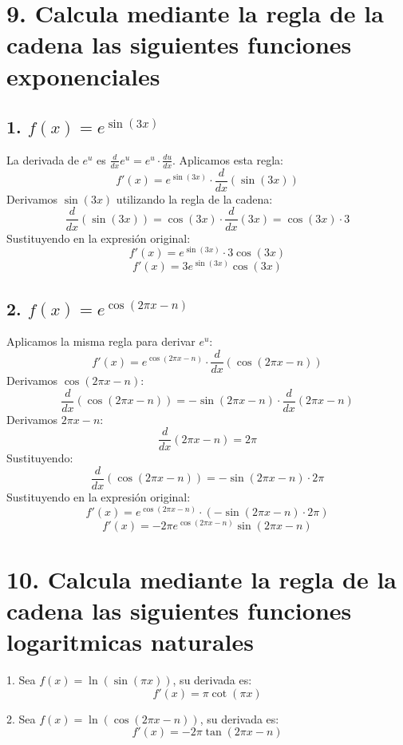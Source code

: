 \documentclass{article}
\begin{document}
\section*{9. Calcula mediante la regla de la cadena las siguientes funciones exponenciales}

\subsection*{1. $f(x) = e^{\sin(3x)}$}
La derivada de $e^u$ es $\frac{d}{dx} e^u = e^u \cdot \frac{du}{dx}$. Aplicamos esta regla:
\[
f'(x) = e^{\sin(3x)} \cdot \frac{d}{dx}(\sin(3x))
\]
Derivamos $\sin(3x)$ utilizando la regla de la cadena:
\[
\frac{d}{dx}(\sin(3x)) = \cos(3x) \cdot \frac{d}{dx}(3x) = \cos(3x) \cdot 3
\]
Sustituyendo en la expresión original:
\[
f'(x) = e^{\sin(3x)} \cdot 3\cos(3x)
\]
\[
f'(x) = 3e^{\sin(3x)}\cos(3x)
\]

\subsection*{2. $f(x) = e^{\cos(2\pi x - n)}$}
Aplicamos la misma regla para derivar $e^u$:
\[
f'(x) = e^{\cos(2\pi x - n)} \cdot \frac{d}{dx}(\cos(2\pi x - n))
\]
Derivamos $\cos(2\pi x - n)$:
\[
\frac{d}{dx}(\cos(2\pi x - n)) = -\sin(2\pi x - n) \cdot \frac{d}{dx}(2\pi x - n)
\]
Derivamos $2\pi x - n$:
\[
\frac{d}{dx}(2\pi x - n) = 2\pi
\]
Sustituyendo:
\[
\frac{d}{dx}(\cos(2\pi x - n)) = -\sin(2\pi x - n) \cdot 2\pi
\]
Sustituyendo en la expresión original:
\[
f'(x) = e^{\cos(2\pi x - n)} \cdot \left(-\sin(2\pi x - n) \cdot 2\pi\right)
\]
\[
f'(x) = -2\pi e^{\cos(2\pi x - n)} \sin(2\pi x - n)
\]
\section*{10. Calcula mediante la regla de la cadena las siguientes funciones logaritmicas naturales}

1. Sea \( f(x) = \ln(\sin(\pi x)) \), su derivada es:
\[
f'(x) = \pi \cot(\pi x)
\]

2. Sea \( f(x) = \ln(\cos(2\pi x - n)) \), su derivada es:
\[
f'(x) = -2\pi \tan(2\pi x - n)
\]
\end{document}
